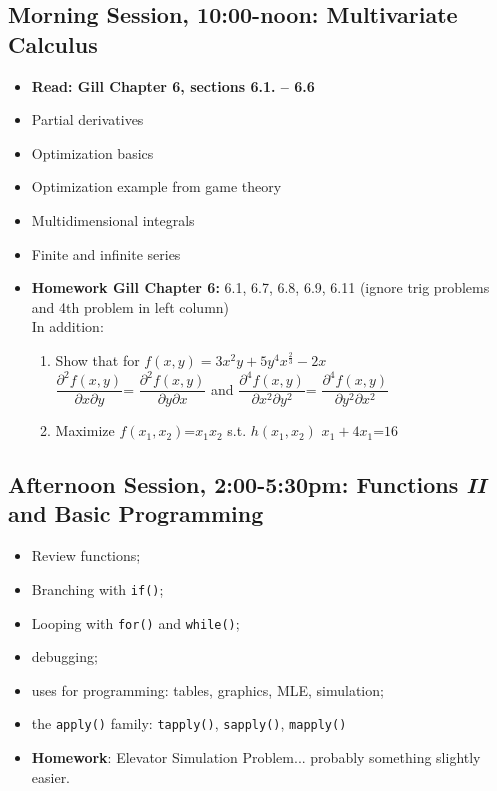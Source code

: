 \documentclass[12pt,a4paper]{article}
\begin{document}
\subsection*{Morning Session, 10:00-noon:  Multivariate Calculus}
\begin{itemize}
\setlength{\itemsep}{0pt}
\footnotesize
\item \textbf{Read: Gill Chapter 6, sections 6.1. -- 6.6}
\item Partial derivatives
\item Optimization basics
\item Optimization example from game theory
\item Multidimensional integrals
\item Finite and infinite series
\item \textbf{Homework Gill Chapter 6:} 6.1, 6.7, 6.8, 6.9,  6.11 (ignore trig problems and 4th problem in left column) \\ In addition: 
\begin{enumerate} 
\item Show that for $f(x,y) = 3x^{2}y+ 5y^{4}x^{\frac{2}{3}}-2x$\\ $\dfrac{\partial^2 f(x,y)}{\partial x \partial y}$= $\dfrac{\partial^2 f(x,y)}{\partial y \partial x}$ and  $\dfrac{\partial^4 f(x,y)}{\partial x^2 \partial y^2}$= $\dfrac{\partial^4 f(x,y)}{\partial y^2 \partial x^2}$\\
\item Maximize $f(x_1, x_2)$=$x_1x_2$ s.t. $h(x_1, x_2)$ $x_1+4x_1$=$16$
\end{enumerate}


\end{itemize}




\subsection*{Afternoon Session, 2:00-5:30pm: Functions \emph{II} and Basic Programming}
\begin{itemize}
\setlength{\itemsep}{0pt}
\footnotesize
\item Review functions;
\item Branching with \texttt{if()};
\item Looping with \texttt{for()} and \texttt{while()};
\item debugging;
\item uses for programming: tables, graphics, MLE, simulation;
\item the \texttt{apply()} family: \texttt{tapply()}, \texttt{sapply()}, \texttt{mapply()}
\item \textbf{Homework}: Elevator Simulation Problem... probably something slightly easier.
\end{itemize}
\end{document}

